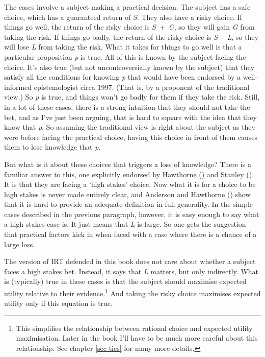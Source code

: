 \documentclass[
  10pt,
  letterpaper,
  twoside]{scrbook}
\begin{document}
The cases involve a subject making a practical decision. The subject has
a safe choice, which has a guaranteed return of \emph{S}. They also have
a risky choice. If things go well, the return of the risky choice is
\emph{S}~+~\emph{G}, so they will gain \emph{G} from taking the risk. If
things go badly, the return of the risky choice is \emph{S}~‑~\emph{L},
so they will lose \emph{L} from taking the risk. What it takes for
things to go well is that a particular proposition \emph{p} is true. All
of this is known by the subject facing the choice. It's also true (but
not uncontroversially known by the subject) that they satisfy all the
conditions for knowing \emph{p} that would have been endorsed by a
well-informed epistemologist circa 1997. (That is, by a proponent of the
traditional view.) So \emph{p} is true, and things won't go badly for
them if they take the risk. Still, in a lot of these cases, there is a
strong intuition that they should not take the bet, and as I've just
been arguing, that is hard to square with the idea that they know that
\emph{p}. So assuming the traditional view is right about the subject as
they were before facing the practical choice, having this choice in
front of them causes them to lose knowledge that \emph{p}.

But what is it about these choices that triggers a loss of knowledge?
There is a familiar answer to this, one explicitly endorsed by Hawthorne
() and Stanley
(). It is that they are facing a `high
stakes' choice. Now what it is for a choice to be high stakes is never
made entirely clear, and Anderson and Hawthorne
() show that it is hard to
provide an adequate definition in full generality. In the simple cases
described in the previous paragraph, however, it is easy enough to say
what a high stakes case is. It just means that \emph{L} is large. So one
gets the suggestion that practical factors kick in when faced with a
case where there is a chance of a large loss.

The version of IRT defended in this book does not care about whether a
subject faces a high stakes bet. Instead, it says that \emph{L} matters,
but only indirectly. What is (typically) true in these cases is that the
subject should maximise expected utility relative to their
evidence.\footnote{This simplifies the relationship between rational
  choice and expected utility maximisation. Later in the book I'll have
  to be much more careful about this relationship. See chapter
  \ref{sec-ties} for many more details.} And taking the risky choice
maximises expected utility only if this equation is true.
\end{document}
